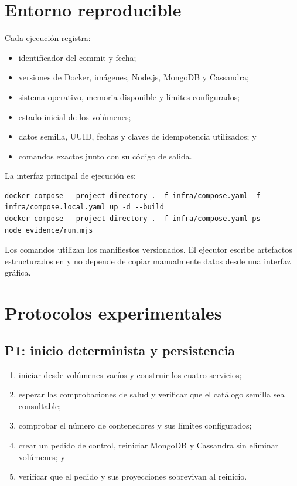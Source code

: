 \section{Entorno reproducible}

Cada ejecución registra:

\begin{itemize}
  \item identificador del commit y fecha;
  \item versiones de Docker, imágenes, Node.js, MongoDB y Cassandra;
  \item sistema operativo, memoria disponible y límites configurados;
  \item estado inicial de los volúmenes;
  \item datos semilla, UUID, fechas y claves de idempotencia utilizados; y
  \item comandos exactos junto con su código de salida.
\end{itemize}

La interfaz principal de ejecución es:

\begin{lstlisting}[caption={Secuencia para levantar y evaluar el entorno}]
docker compose --project-directory . -f infra/compose.yaml -f infra/compose.local.yaml up -d --build
docker compose --project-directory . -f infra/compose.yaml ps
node evidence/run.mjs
\end{lstlisting}

Los comandos utilizan los manifiestos versionados. El ejecutor escribe artefactos estructurados en  y no depende de copiar manualmente datos desde una interfaz gráfica.

\section{Protocolos experimentales}

\subsection{P1: inicio determinista y persistencia}

\begin{enumerate}
  \item iniciar desde volúmenes vacíos y construir los cuatro servicios;
  \item esperar las comprobaciones de salud y verificar que el catálogo semilla sea consultable;
  \item comprobar el número de contenedores y sus límites configurados;
  \item crear un pedido de control, reiniciar MongoDB y Cassandra sin eliminar volúmenes; y
  \item verificar que el pedido y sus proyecciones sobrevivan al reinicio.
\end{enumerate}

